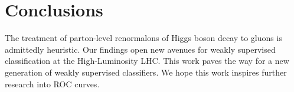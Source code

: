 \section{Conclusions}\label{sec:conclusions}

The treatment of parton-level renormalons of Higgs boson decay to gluons
is admittedly heuristic. Our findings open new avenues for weakly
supervised classification at the High-Luminosity LHC. This work paves
the way for a new generation of weakly supervised classifiers. We hope
this work inspires further research into ROC curves.

